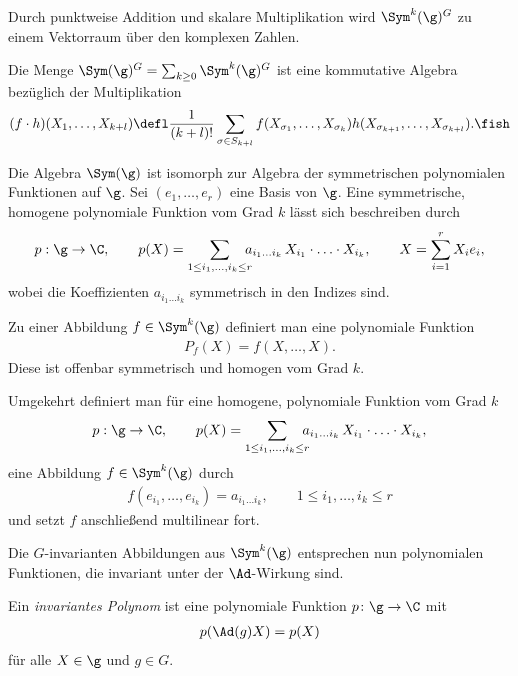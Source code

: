 \documentclass[%
	paper=a5,%
	fleqn,%
	DIV=18,%
	BCOR=0mm,
	fontsize=11pt,
	titlepage=false,%
	bibliography=totoc,
	DIV=18,%
	twoside=true,
	pdftitle=Riemannsche Geometrie,
	pdfauthor=Uwe Semmelmann,
	numbers=noendperiod]%
	{scrbook}
\begin{document}
Durch punktweise Addition und skalare Multiplikation wird $\Sym^k(\g)^G$ zu
einem Vektorraum über den komplexen Zahlen.

\begin{lem}
Die Menge $\Sym(\g)^G = \sum_{k\ge0} \Sym^k(\g)^G$ ist eine kommutative
Algebra bezüglich der Multiplikation
\begin{align*}
(f\cdot h)(X_1,\ldots,X_{k+l}) \defl
\frac{1}{(k+l)!}\sum_{\sigma\in S_{k+l}} f(X_{\sigma_1},\ldots,X_{\sigma_k})
h(X_{\sigma_{k+1}},\ldots,X_{\sigma_{k+l}}).\fish
\end{align*}
\end{lem}

\begin{rem}
Die Algebra $\Sym(\g)$ ist isomorph zur Algebra der symmetrischen polynomialen
Funktionen auf $\g$. Sei $(e_1,\ldots,e_r)$ eine Basis von $\g$. Eine
symmetrische, homogene polynomiale Funktion vom Grad $k$ lässt sich beschreiben
durch
\begin{align*}
p: \g\to \C,\qquad p(X)
 = \sum_{1\le i_1,\ldots,i_k \le r}
\!\!\!\!
a_{i_1\ldots i_k}\, X_{i_1}\cdot \ldots \cdot X_{i_k},
\qquad
X=\sum_{i=1}^r X_i e_i,
\end{align*}
wobei die Koeffizienten $a_{i_1\ldots i_k}$ symmetrisch in den Indizes sind.

Zu einer Abbildung $f\in \Sym^k(\g)$ definiert man eine polynomiale Funktion
\begin{align*}
P_f(X)  = f(X,\ldots,X).
\end{align*}
Diese ist offenbar symmetrisch und homogen vom Grad $k$.

Umgekehrt definiert man für eine homogene, polynomiale Funktion vom Grad $k$
\begin{align*}
p: \g\to \C,\qquad p(X) = \sum_{1\le i_1,\ldots,i_k \le r}
\!\!\!\!
a_{i_1\ldots i_k}\, X_{i_1}\cdot \ldots \cdot X_{i_k},
\end{align*}
eine Abbildung $f\in \Sym^k(\g)$ durch
\begin{align*}
f(e_{i_1},\ldots,e_{i_k}) = a_{i_1\ldots i_k},\qquad 1\le i_1,\ldots,i_k \le r
\end{align*}
und setzt $f$ anschließend multilinear fort.\map
\end{rem}

Die $G$-invarianten Abbildungen aus $\Sym^k(\g)$ entsprechen nun polynomialen
Funktionen, die invariant unter der $\Ad$-Wirkung sind.

\begin{defn}
Ein \emph{invariantes Polynom} ist eine polynomiale Funktion $p\colon\g\to \C$ mit
\begin{align*}
p(\Ad(g)X) = p(X)
\end{align*}
für alle $X\in\g$ und $g\in G$.\fish
\end{defn}
\end{document}
